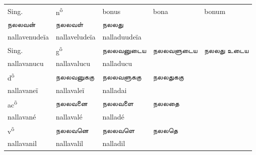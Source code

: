 \documentclass[12pt,a4paper]{scrbook}
\begin{document}
      
\begin{tabular}{lllll}
    
          
            Sing. &
            n\textsuperscript{õ} &
            bonus &
            bona &
            bonum \\
    
          
    
          
            நலலவன் &
             நலலவள் &
             நலலது \\
    
          
    
          
            nallavenudeïa &
            nallaveludeïa &
            nalladuudeïa \\
    
          
    
          
            Sing. &
            g\textsuperscript{õ} &
            நலலவனுடைய &
            நலலவளுடைய &
            நலலது உடைய \\
    
          
    
          
            nallavanucu &
            nallavalucu &
            nalladucu \\
    
          
    
          
            d\textsuperscript{õ} &
            நலலவனுககு &
            நலலவளுககு &
            நலலதுககு \\
    
          
    
          
            nallavaneï &
            nallavaleï &
            nalladai \\
    
          
    
          
            ac\textsuperscript{õ} &
            நலலவனை &
            நலலவளை &
            நலலதை \\
    
          
    
          
            nallavané &
            nallavalé &
            nalladé \\
    
          
    
          
            v\textsuperscript{õ} &
            நலலவனெ &
            நலலவளெ &
            நலலதெ \\
    
          
    
          
            nallavanil &
            nallavalil &
            nalladil \\
    

\end{tabular}
\end{document}

